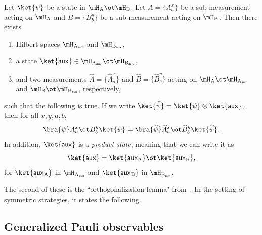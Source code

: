 \begin{theorem}\label{thm:naimark}
Let $\ket{\psi}$ be a state in $\mH_{\mathrm{A}} \ot \mH_{\mathrm{B}}$.
Let $A = \{A^x_a\}$ be a sub-measurement acting on $\mH_{\mathrm{A}}$
and $B=\{B^y_b\}$ be a sub-measurement acting on $\mH_{\mathrm{B}}$.
Then there exists
\begin{enumerate}
\item Hilbert spaces $\mH_{\mathrm{A}_{\mathsf{aux}}}$ and $\mH_{\mathrm{B}_{\mathsf{aux}}}$,
\item a state $\ket{\mathsf{aux}} \in \mH_{\mathrm{A}_{\mathsf{aux}}} \ot \mH_{\mathrm{B}_{\mathsf{aux}}}$,
\item and two measurements  $\widehat{A} = \{\widehat{A}^x_a\}$ and $\widehat{B}=\{\widehat{B}^y_b\}$
acting on $\mH_{\mathrm{A}} \ot \mH_{\mathrm{A}_{\mathsf{aux}}}$
and $\mH_{\mathrm{B}} \ot \mH_{\mathrm{B}_{\mathsf{aux}}}$,
respectively,
\end{enumerate}
such that the following is true.
If we write $\ket{\widehat{\psi}} = \ket{\psi} \otimes \ket{\mathsf{aux}}$,
then for all $x,y, a, b$,
 \begin{equation*}
 \bra{\psi} A^x_a \ot B^y_b \ket{\psi}
 = \bra{\widehat{\psi}} \widehat{A}^x_a \ot \widehat{B}^y_b \ket{\widehat{\psi}}.
 \end{equation*}
 In addition, $\ket{\mathsf{aux}}$ is a \emph{product state},
 meaning that we can write it as
 \begin{equation*}
 \ket{\mathsf{aux}}= \ket{\mathsf{aux}_{\mathrm{A}}} \ot \ket{\mathsf{aux}_{\mathrm{B}}},
 \end{equation*}
for $\ket{\mathsf{aux}_{\mathrm{A}}}$ in $\mH_{\mathrm{A}_{\mathsf{aux}}}$
and $\ket{\mathsf{aux}_{\mathrm{B}}}$ in $\mH_{\mathrm{B}_{\mathsf{aux}}}$.
\end{theorem}
The second of these is the ``orthogonalization lemma" from~\cite{KV11}.
In the setting of symmetric strategies, it states the following.















\subsection{Generalized Pauli observables}
\label{sec:generalized-pauli}


